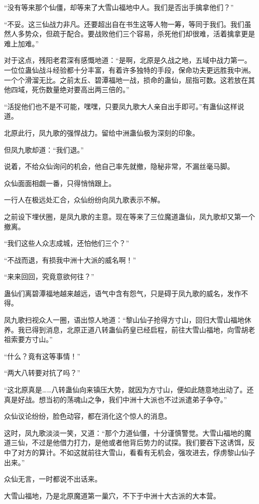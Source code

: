 \begin{this_body}
“没有等来那个仙僵，却等来了大雪山福地中人。我们是否出手擒拿他们？”

“不妥。这三仙战力非凡。还要超出自在书生这等人物一筹，等同于我们。我们虽然人多势众，但疏于配合。要战败他们三个容易，杀死他们却很难，活着擒拿更是难上加难。”

对于这点，残阳老君深有感慨地道：“是啊，北原是久战之地，五域中战力第一。一位位蛊仙战斗经验都十分丰富，有着许多独特的手段，保命功夫更远胜我中洲。一个个滑溜无比。之前太丘、碧潭福地一战，损命的蛊仙，屈指可数。这若放在其他四域，死伤数量绝对要高出两三倍的。”

“活捉他们也不是不可能，嘿嘿，只要凤九歌大人亲自出手即可。”有蛊仙这样说道。

北原此行，凤九歌的强悍战力。留给中洲蛊仙极为深刻的印象。

但凤九歌却道：“我们退。”

说着，不给众仙询问的机会，他自己率先就撤，隐秘非常，不漏丝毫马脚。

众仙面面相觑一番，只得悄悄跟上。

一行人在极远处汇合，众仙纷纷向凤九歌表示不解。

之前设下埋伏圈，是凤九歌的主意。现在等来了三位魔道蛊仙，凤九歌却又第一个撤离。

“我们这些人众志成城，还怕他们三个？”

“不战而退，有损我中洲十大派的威名啊！”

“来来回回，究竟意欲何往？”

蛊仙们离碧潭福地越来越远，语气中含有怨气，只是碍于凤九歌的威名，发作不得。

凤九歌扫视众人一圈，语出惊人地道：“黎山仙子抢得方寸山，回归大雪山福地休养。我已得到消息，北原正道八转蛊仙药皇已经启程，前往大雪山福地，向雪胡老祖索要方寸山。”

“什么？竟有这等事情！”

“两大八转要对抗了吗？”

“这北原真是……八转蛊仙向来镇压大势，就因为方寸山，便如此随意地出动了。还真是好战。想当初的荡魂山之争，我们中洲十大派也不过派遣弟子争夺。”

众仙议论纷纷，脸色动容，都在消化这个惊人的消息。

这时，凤九歌淡淡一笑，又道：“那个力道仙僵，十分谨慎警觉。大雪山福地的魔道三仙，不过是他借力打力，是他或者他背后势力的试探。我们要吞下这诱饵，反中了对方的算计。不如这就前往大雪山，看看有无机会，强攻进去，俘虏黎山仙子出来。”

众仙无言，一时都说不出话来。

大雪山福地，乃是北原魔道第一巢穴，不下于中洲十大古派的大本营。


\end{this_body}
